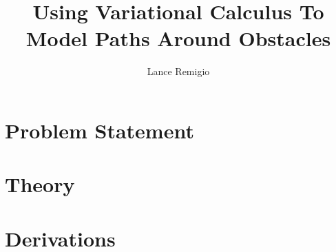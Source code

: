 \documentclass[a4paper]{report}
\title{Using Variational Calculus To Model Paths Around Obstacles}
\author{Lance Remigio}
\begin{document}
\maketitle

\chapter{Problem Statement}



\chapter{Theory}



\chapter{Derivations}


\end{document}
